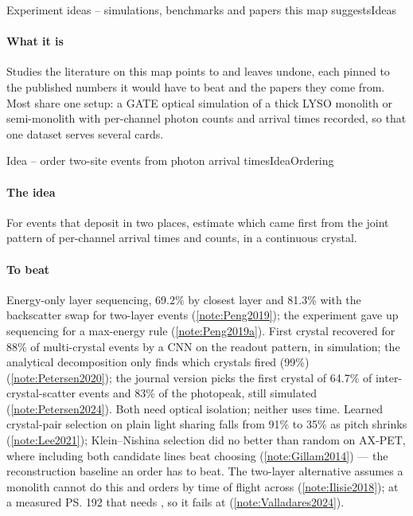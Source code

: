 
\begin{programnote}{Experiment ideas -- simulations, benchmarks and papers this map suggests}{Ideas}

\paragraph{What it is}
Studies the literature on this map points to and leaves undone, each pinned to
the published numbers it would have to beat and the papers they come from.
Most share one setup: a GATE optical simulation of a thick LYSO monolith or
semi-monolith with per-channel photon counts and arrival times recorded, so
that one dataset serves several cards.

\begin{papernote}{Idea -- order two-site events from photon arrival times}{IdeaOrdering}
\paragraph{The idea}
For events that deposit in two places, estimate which came first from the
joint pattern of per-channel arrival times and counts, in a continuous crystal.

\paragraph{To beat}
Energy-only layer sequencing, 69.2\% by closest layer and 81.3\% with the
backscatter swap for two-layer events (\ref{note:Peng2019}); the experiment
gave up sequencing for a max-energy rule (\ref{note:Peng2019a}). First crystal
recovered for 88\% of multi-crystal events by a CNN on the readout pattern, in
simulation; the analytical decomposition only finds which crystals fired (99\%)
(\ref{note:Petersen2020}); the journal version picks the first crystal of
64.7\% of inter-crystal-scatter events and 83\% of the photopeak, still
simulated (\ref{note:Petersen2024}). Both need optical isolation; neither uses
time.
Learned crystal-pair selection on plain light sharing falls from 91\% to
35\% as pitch shrinks (\ref{note:Lee2021}); Klein--Nishina selection did no
better than random on AX-PET, where including both candidate lines beat
choosing (\ref{note:Gillam2014}) --- the reconstruction baseline an order has
to beat. The two-layer alternative assumes a monolith cannot do this and orders
by time of flight across  (\ref{note:Ilisie2018}); at a measured
\ps{192} that needs , so it fails at 
(\ref{note:Valladares2024}).


\end{papernote}
\end{programnote}
